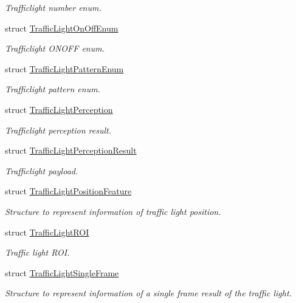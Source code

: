 \begin{DoxyCompactItemize}
\begin{DoxyCompactList}\small\item\em Trafficlight number enum. \end{DoxyCompactList}\item 
struct \hyperlink{structmaf__perception__interface_1_1TrafficLightOnOffEnum}{Traffic\+Light\+On\+Off\+Enum}
\begin{DoxyCompactList}\small\item\em Trafficlight O\+N\+O\+FF enum. \end{DoxyCompactList}\item 
struct \hyperlink{structmaf__perception__interface_1_1TrafficLightPatternEnum}{Traffic\+Light\+Pattern\+Enum}
\begin{DoxyCompactList}\small\item\em Trafficlight pattern enum. \end{DoxyCompactList}\item 
struct \hyperlink{structmaf__perception__interface_1_1TrafficLightPerception}{Traffic\+Light\+Perception}
\begin{DoxyCompactList}\small\item\em Trafficlight perception result. \end{DoxyCompactList}\item 
struct \hyperlink{structmaf__perception__interface_1_1TrafficLightPerceptionResult}{Traffic\+Light\+Perception\+Result}
\begin{DoxyCompactList}\small\item\em Trafficlight payload. \end{DoxyCompactList}\item 
struct \hyperlink{structmaf__perception__interface_1_1TrafficLightPositionFeature}{Traffic\+Light\+Position\+Feature}
\begin{DoxyCompactList}\small\item\em Structure to represent information of traffic light position. \end{DoxyCompactList}\item 
struct \hyperlink{structmaf__perception__interface_1_1TrafficLightROI}{Traffic\+Light\+R\+OI}
\begin{DoxyCompactList}\small\item\em Traffic light R\+OI. \end{DoxyCompactList}\item 
struct \hyperlink{structmaf__perception__interface_1_1TrafficLightSingleFrame}{Traffic\+Light\+Single\+Frame}
\begin{DoxyCompactList}\small\item\em Structure to represent information of a single frame result of the traffic light. \end{DoxyCompactList}\item 

\end{DoxyCompactItemize}
